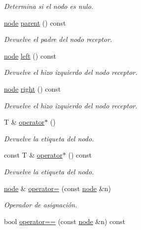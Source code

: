 \begin{DoxyCompactItemize}
\begin{DoxyCompactList}\small\item\em Determina si el nodo es nulo. \end{DoxyCompactList}\item 
\hyperlink{classbintree_1_1node}{node} \hyperlink{classbintree_1_1node_a09ca860544efb439a685bbeb5d3107a9}{parent} () const 
\begin{DoxyCompactList}\small\item\em Devuelve el padre del nodo receptor. \end{DoxyCompactList}\item 
\hyperlink{classbintree_1_1node}{node} \hyperlink{classbintree_1_1node_a21bdc0016677746f28b3c44bdb69c3c2}{left} () const 
\begin{DoxyCompactList}\small\item\em Devuelve el hizo izquierdo del nodo receptor. \end{DoxyCompactList}\item 
\hyperlink{classbintree_1_1node}{node} \hyperlink{classbintree_1_1node_a547b66653137db889451d4dbaffde8f9}{right} () const 
\begin{DoxyCompactList}\small\item\em Devuelve el hizo izquierdo del nodo receptor. \end{DoxyCompactList}\item 
T \& \hyperlink{classbintree_1_1node_ae3b25e1d16c449a3c0e211cd0ebe5739}{operator$\ast$} ()
\begin{DoxyCompactList}\small\item\em Devuelve la etiqueta del nodo. \end{DoxyCompactList}\item 
const T \& \hyperlink{classbintree_1_1node_af9119b26b416b2a8a8c8b1ff7ec1a3e7}{operator$\ast$} () const 
\begin{DoxyCompactList}\small\item\em Devuelve la etiqueta del nodo. \end{DoxyCompactList}\item 
\hyperlink{classbintree_1_1node}{node} \& \hyperlink{classbintree_1_1node_a184f20617c0324caa3f66e4dce1338e5}{operator=} (const \hyperlink{classbintree_1_1node}{node} \&n)
\begin{DoxyCompactList}\small\item\em Operador de asignación. \end{DoxyCompactList}\item 
bool \hyperlink{classbintree_1_1node_ab1dd1b2d59b615f92850e5f8675fb141}{operator==} (const \hyperlink{classbintree_1_1node}{node} \&n) const 

\end{DoxyCompactItemize}
